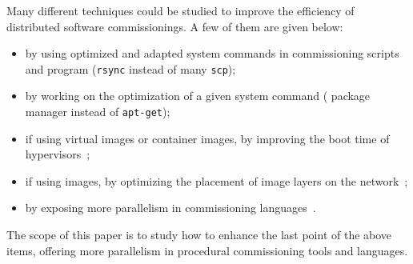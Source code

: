 Many different techniques could be studied to improve the efficiency
of distributed software commissionings. A few of them are given below:
\begin{itemize}
\item by using optimized and adapted system commands in commissioning
  scripts and program (\eg \texttt{rsync} instead of many
  \texttt{scp});
\item by working on the optimization of a given system command (\eg
  \nix package manager instead of \texttt{apt-get});
\item if using virtual images or container images, by improving the
  boot time of hypervisors~\cite{nguyen:hal-02172288};
\item if using \docker images, by optimizing the placement of image
  layers on the network~\cite{darrous:hal-01745405};
\item by exposing more parallelism in commissioning
  languages~\cite{dicosmo:hal-01233489}.
\end{itemize}

\begin{tcolorbox}[enhanced,attach boxed title to top left={yshift=-3mm,yshifttext=-1mm},
  colback=black!5!white,colframe=black!30,colbacktitle=black!60,
  title=Scope,fonttitle=\bfseries,
  boxed title style={size=small,colframe=black!60,boxrule=0.2mm},
  boxrule=0.2mm]
  The scope of this paper is to study how to enhance the last point of
  the above items, \ie offering more parallelism in procedural
  commissioning tools and languages.
\end{tcolorbox}

